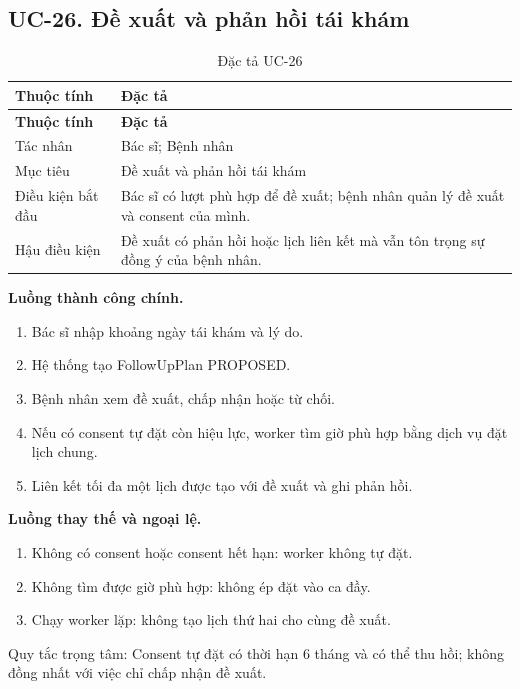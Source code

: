 \clearpage

\subsection{UC-26.\allowbreak{} Đề xuất và phản hồi tái khám}
\label{uc:26}

{\small\setlength{\tabcolsep}{3pt}\renewcommand{\arraystretch}{1.12}
\begin{longtable}{@{}L{\textwidth-1.32pt\relax} L{\textwidth-4.68pt\relax}@{}}
\caption{Đặc tả UC-26}\\
\toprule
\textbf{Thuộc tính} & \textbf{Đặc tả}\\\midrule
\endfirsthead
\toprule
\textbf{Thuộc tính} & \textbf{Đặc tả}\\\midrule
\endhead
\bottomrule\endlastfoot
Tác nhân & Bác sĩ; Bệnh nhân\\[3pt]
Mục tiêu & Đề xuất và phản hồi tái khám\\[3pt]
Điều kiện bắt đầu & Bác sĩ có lượt phù hợp để đề xuất; bệnh nhân quản lý đề xuất và consent của mình.\allowbreak{}\\[3pt]
Hậu điều kiện & Đề xuất có phản hồi hoặc lịch liên kết mà vẫn tôn trọng sự đồng ý của bệnh nhân.\allowbreak{}\\[3pt]
\end{longtable}}
\noindent\textbf{Luồng thành công chính.}
\begin{enumerate}
\item Bác sĩ nhập khoảng ngày tái khám và lý do.\allowbreak{}
\item Hệ thống tạo Follow\allowbreak{}Up\allowbreak{}Plan PROPOSED.\allowbreak{}
\item Bệnh nhân xem đề xuất, chấp nhận hoặc từ chối.\allowbreak{}
\item Nếu có consent tự đặt còn hiệu lực, worker tìm giờ phù hợp bằng dịch vụ đặt lịch chung.\allowbreak{}
\item Liên kết tối đa một lịch được tạo với đề xuất và ghi phản hồi.\allowbreak{}
\end{enumerate}
\noindent\textbf{Luồng thay thế và ngoại lệ.}
\begin{enumerate}
\item Không có consent hoặc consent hết hạn:\allowbreak{} worker không tự đặt.\allowbreak{}
\item Không tìm được giờ phù hợp:\allowbreak{} không ép đặt vào ca đầy.\allowbreak{}
\item Chạy worker lặp:\allowbreak{} không tạo lịch thứ hai cho cùng đề xuất.\allowbreak{}
\end{enumerate}
Quy tắc trọng tâm:\allowbreak{} Consent tự đặt có thời hạn 6 tháng và có thể thu hồi; không đồng nhất với việc chỉ chấp nhận đề xuất.\allowbreak{}

